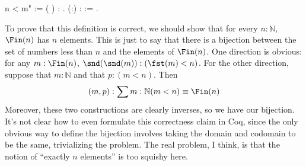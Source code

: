 \begin{coqdoccode}
\coqdocnoindent
{} n < m" := (  ) : .\coqdoceol
\coqdocemptyline
\coqdocnoindent
{}  (:) :  :=     .\coqdoceol
\coqdocemptyline
\end{coqdoccode}
\noindent
To prove that this definition is correct, we should show that for every $n :
\mathbb{N}$, $\Fin(n)$ has $n$ elements.  This is just to say that there is a
bijection between the set of numbers less than $n$ and the elements of
$\Fin(n)$.  One direction is obvious: for any $m : \Fin(n)$,
$\snd(\snd(m)):(\fst(m) < n)$.  For the other direction, suppose that $m :
\mathbb{N}$ and that $p : (m < n)$.  Then
\[
  (m, p) : \sum{m:\mathbb{N}}(m < n) \equiv \Fin(n)
\]
Moreover, these two constructions are clearly inverses, so we have our
bijection.  It's not clear how to even formulate this correctness claim in Coq, since the only obvious way to define the bijection involves taking the domain and codomain to be the same, trivializing the problem.  The real problem, I think, is that the notion of ``exactly $n$ elements'' is too squishy here.


